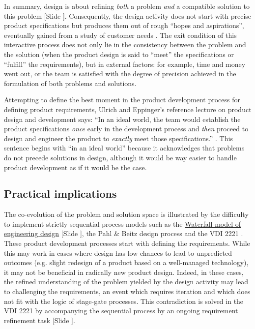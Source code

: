 \documentclass{article}
\newcounter{slide}
\begin{document}
In summary, design is about refining \emph{both} a problem \emph{and} a compatible solution to this problem {\color{blue}[Slide ]}. Consequently, the design activity does not start with precise product specifications but produces them out of rough ``hopes and aspirations'', eventually gained from a study of customer needs \cite[p. 73]{ulrichProductDesignDevelopment2011}. The exit condition of this interactive process does not only lie in the consistency between the problem and the solution (when the product design is said to ``meet'' the specifications or ``fulfill'' the requirements), but in external factors: for example, time and money went out, or the team is satisfied with the degree of precision achieved in the formulation of both problems and solutions. 

Attempting to define the best moment in the product development process for defining product requirements, Ulrich and Eppinger's reference lecture on product design and development says: ``In an ideal world, the team would establish the product specifications \emph{once} early in the development process and \emph{then} proceed to design and engineer the product to \emph{exactly} meet those specifications.'' \cite[p. 73, emphases are not in the original text]{ulrichProductDesignDevelopment2011}. This sentence begins with ``in an ideal world'' because it acknowledges that problems do not precede solutions in design, although it would be way easier to handle product development as if it would be the case. 

\subsection{Practical implications}
\label{sec:practicalimplicationstwo}

The co-evolution of the problem and solution space is illustrated by the difficulty to implement strictly sequential process models such as the \href{https://en.wikipedia.org/wiki/Waterfall\_model}{Waterfall model of engineering design} {\color{blue}[Slide ]}, the Pahl \& Beitz design process \cite{pahlEngineeringDesignSystematic2007} and the VDI 2221 \cite{vdi1993design}. These product development processes start with defining the requirements. While this may work in cases where design has low chances to lead to unpredicted outcomes (e.g. slight redesign of a product based on a well-managed technology), it may not be beneficial in radically new product design. Indeed, in these cases, the refined understanding of the problem yielded by the design activity may lead to challenging the requirements, an event which requires iteration and which does not fit with the logic of stage-gate processes. This contradiction is solved in the VDI 2221 by accompanying the sequential process by an ongoing requirement refinement task \cite{vdi1993design} {\color{blue}[Slide ]}.
\end{document}
